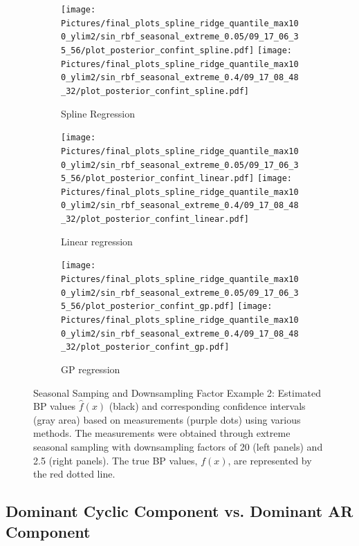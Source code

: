 \begin{figure}
\begin{subfigure}{\textwidth}
    \centering
    \texttt{[image: 
        Pictures/final\_plots\_spline\_ridge\_quantile\_max100\_ylim2/sin\_rbf\_seasonal\_extreme\_0.05/09\_17\_06\_35\_56/plot\_posterior\_confint\_spline.pdf]}
    \texttt{[image: 
    Pictures/final\_plots\_spline\_ridge\_quantile\_max100\_ylim2/sin\_rbf\_seasonal\_extreme\_0.4/09\_17\_08\_48\_32/plot\_posterior\_confint\_spline.pdf]}
  \caption{Spline Regression}
\end{subfigure}

\begin{subfigure}{\textwidth}
    \centering
    \texttt{[image: 
    Pictures/final\_plots\_spline\_ridge\_quantile\_max100\_ylim2/sin\_rbf\_seasonal\_extreme\_0.05/09\_17\_06\_35\_56/plot\_posterior\_confint\_linear.pdf]}
    \texttt{[image: 
       Pictures/final\_plots\_spline\_ridge\_quantile\_max100\_ylim2/sin\_rbf\_seasonal\_extreme\_0.4/09\_17\_08\_48\_32/plot\_posterior\_confint\_linear.pdf]}
  \caption{Linear regression }
\end{subfigure}

\begin{subfigure}{\textwidth}
    \centering
    \texttt{[image: 
    Pictures/final\_plots\_spline\_ridge\_quantile\_max100\_ylim2/sin\_rbf\_seasonal\_extreme\_0.05/09\_17\_06\_35\_56/plot\_posterior\_confint\_gp.pdf]}
    \texttt{[image: 
       Pictures/final\_plots\_spline\_ridge\_quantile\_max100\_ylim2/sin\_rbf\_seasonal\_extreme\_0.4/09\_17\_08\_48\_32/plot\_posterior\_confint\_gp.pdf]}
  \caption{GP regression}
\end{subfigure}\hfill

\caption[Seasonal Samping and Downsampling Factor Example 2]{Seasonal Samping and Downsampling Factor Example 2:
    Estimated BP values $\hat{f}(x)$ (black) and corresponding confidence intervals (gray area)
    based on measurements (purple dots) using various methods.
    The measurements were obtained through extreme seasonal sampling with downsampling
    factors of 20 (left panels) and 2.5 (right panels).
    The true BP values, $f(x)$, are represented by the red dotted line.}
\label{fig:ex-seasonal-sampling-linear}
\end{figure}



\subsection{Dominant Cyclic Component vs. Dominant AR Component}
\label{subsec:dominant-cyclic-component-vs-dominant-ar-component}

